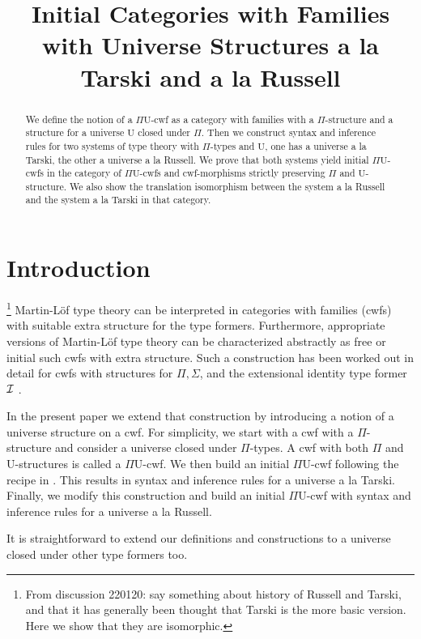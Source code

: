 \documentclass{lmcs}
\title{Initial Categories with Families\\ with Universe Structures 
a la Tarski and a la Russell}
\def\UU{\mathrm{U}}
\begin{document}
\maketitle

\begin{abstract}
We define the notion of a $\Pi\UU$-cwf as a category with families with a $\Pi$-structure and a structure for a universe $\UU$ closed under $\Pi$. Then we construct syntax and inference rules for two systems of type theory with $\Pi$-types and $\UU$, one has a universe a la Tarski, the other a universe a la Russell. We prove that both systems yield initial $\Pi\UU$-cwfs in the category of $\Pi\UU$-cwfs and cwf-morphisms strictly preserving $\Pi$ and $\UU$-structure. We also show the translation isomorphism between the system a la Russell and the system a la Tarski in that category.
 \end{abstract}

\allowdisplaybreaks
\section{Introduction}
\footnote{From discussion 220120: say something about history of Russell and Tarski, and that it has generally been thought that Tarski is the more basic version. Here we show that they are isomorphic.}
Martin-Löf type theory can be interpreted in categories with families (cwfs) with suitable extra structure for the type formers. Furthermore, appropriate versions of Martin-Löf type theory can be characterized  abstractly as free or initial such cwfs with extra structure. Such a construction has been worked out in detail for cwfs with structures for $\Pi, \Sigma$, and the extensional identity type former ${\mathcal I}$ \cite{castellan:tlca2015}. 

In the present paper we extend that construction by introducing a notion of a universe structure on a cwf. For simplicity, we start with a cwf with a $\Pi$-structure and consider a universe closed under $\Pi$-types. A cwf with both $\Pi$ and $\UU$-structures is called a $\Pi\UU$-cwf. We then build an initial  $\Pi\UU$-cwf  following the recipe in \cite{castellan:tlca2015}. This results in syntax and inference rules for a universe a la Tarski. Finally, we modify this construction and build an initial  $\Pi\UU$-cwf  with syntax and inference rules for a universe a la Russell.

It is straightforward to extend our definitions and constructions to a universe closed under other type formers too.
\end{document}

